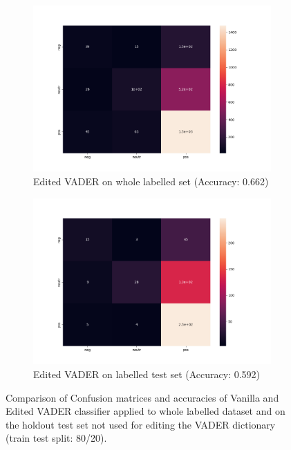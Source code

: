 \documentclass[11pt]{article}
\begin{document}
\begin{figure}[H]
     \hfill \\
     \begin{subfigure}[b]{0.45\textwidth}
         \centering
         \includegraphics[width=\textwidth]{figures/confusion_matrix_vader_bins_acc_0662_full_data.png}
         \caption{Edited VADER on whole labelled set (Accuracy: 0.662)}
         \label{matrix_van_full}
     \end{subfigure}
      \hfill
     \begin{subfigure}[b]{0.45\textwidth}
         \centering
         \includegraphics[width=\textwidth]{figures/confusion_matrix_vader_bins_testset_0592.png}
         \caption{Edited VADER on labelled test set (Accuracy: 0.592)}
         \label{matrix_van_test}
     \end{subfigure}
        \caption{Comparison of Confusion matrices and accuracies of Vanilla and Edited VADER classifier applied to whole labelled dataset and on the holdout test set not used for editing the VADER dictionary (train test split: 80/20).}
        \label{fig:confusion}
\end{figure}
\end{document}
